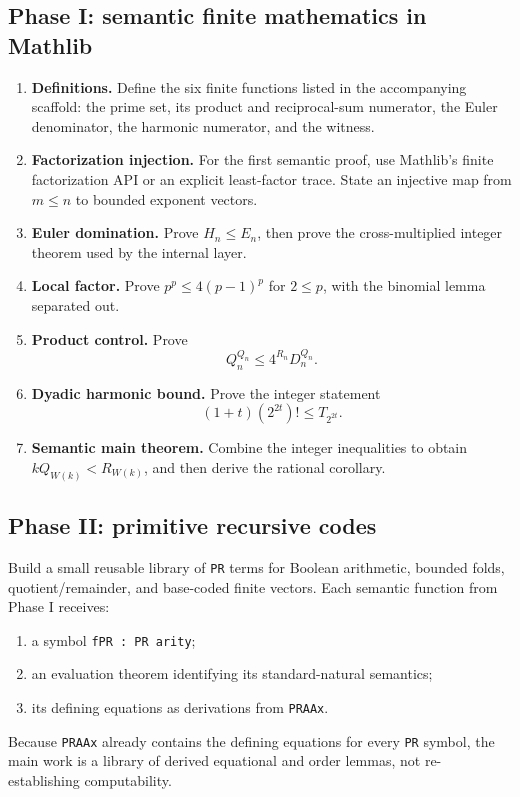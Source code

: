 \documentclass[11pt]{article}
\theoremstyle{definition}
\newcommand{\ProdP}{Q}
\newcommand{\NumP}{R}
\newcommand{\DenE}{D}
\newcommand{\NumH}{T}
\newcommand{\Wit}{W}
\newcommand{\code}[1]{\texttt{#1}}
\begin{document}
\subsection{Phase I: semantic finite mathematics in Mathlib}

\begin{enumerate}[label=I.\arabic*.]
\item \textbf{Definitions.}  Define the six finite functions listed in the
      accompanying scaffold: the prime set, its product and reciprocal-sum
      numerator, the Euler denominator, the harmonic numerator, and the
      witness.
\item \textbf{Factorization injection.}  For the first semantic proof, use
      Mathlib's finite factorization API or an explicit least-factor trace.
      State an injective map from \(m\leq n\) to bounded exponent vectors.
\item \textbf{Euler domination.}  Prove \(H_n\leq E_n\), then prove the
      cross-multiplied integer theorem used by the internal layer.
\item \textbf{Local factor.}  Prove
      \(p^p\leq4(p-1)^p\) for \(2\leq p\), with the binomial lemma separated
      out.
\item \textbf{Product control.}  Prove
      \[
      \ProdP_n^{\ProdP_n}\leq
      4^{\NumP_n}\DenE_n^{\ProdP_n}.
      \]
\item \textbf{Dyadic harmonic bound.}  Prove the integer statement
      \[
        (1+t)(2^{2t})!\leq \NumH_{2^{2t}}.
      \]
\item \textbf{Semantic main theorem.}  Combine the integer inequalities to
      obtain \(k\ProdP_{\Wit(k)}<\NumP_{\Wit(k)}\), and then derive the rational
      corollary.
\end{enumerate}

\subsection{Phase II: primitive recursive codes}

Build a small reusable library of \code{PR} terms for Boolean arithmetic,
bounded folds, quotient/remainder, and base-coded finite vectors.  Each
semantic function from Phase I receives:
\begin{enumerate}[label=II.\arabic*.]
\item a symbol \code{fPR : PR arity};
\item an evaluation theorem identifying its standard-natural semantics;
\item its defining equations as derivations from \code{PRAAx}.
\end{enumerate}
Because \code{PRAAx} already contains the defining equations for every
\code{PR} symbol, the main work is a library of derived equational and order
lemmas, not re-establishing computability.
\end{document}
